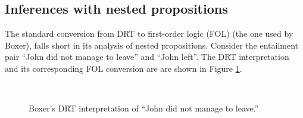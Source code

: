 \subsection*{Inferences with nested propositions}

The standard conversion from DRT to first-order logic (FOL) (the one used by
Boxer), falls short in its analysis of nested propositions.  Consider the
entailment pair ``John did not manage to leave'' and ``John left''.  The DRT
interpretation and its corresponding FOL conversion are are shown in Figure
\ref{drs:impl-1}.

\begin{figure}
  \centering
  ~~~
  \caption{Boxer's DRT interpretation of ``John did not manage to leave.''}
  \label{drs:impl-1}
\end{figure}


